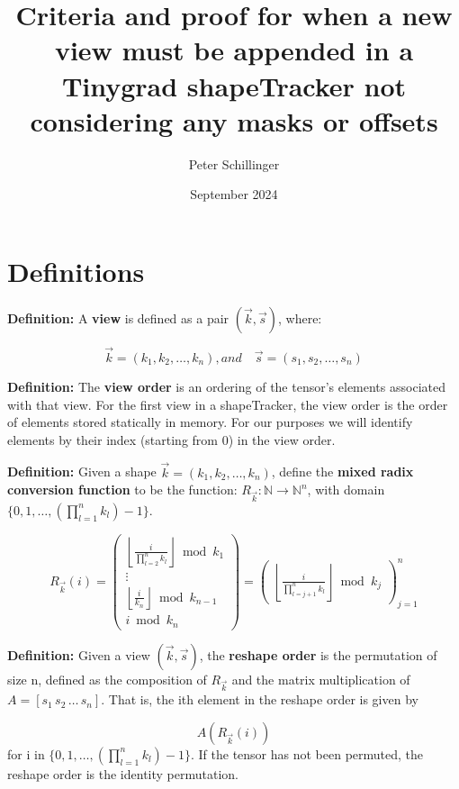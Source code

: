 \documentclass{article}
\title{Criteria and proof for when a new view must be appended in a Tinygrad shapeTracker not considering any masks or offsets}
\author{Peter Schillinger}
\date{September 2024}
\begin{document}
\maketitle
\tableofcontents %

\section{Definitions}

\begin{flushleft}
\textbf{Definition:} A \textbf{view} is defined as a pair \((\vec{k}, \vec{s})\), where:
\end{flushleft}
\[
\vec{k} = (k_1, k_2, \ldots, k_n), and \quad \vec{s} = (s_1, s_2, \ldots, s_n)
\]


\textbf{Definition:} The \textbf{view order} is an ordering of the tensor's elements associated with that view. For the first view in a shapeTracker, the view order is the order of elements stored statically in memory. For our purposes we will identify elements by their index (starting from 0) in the view order. 

\begin{flushleft}
\textbf{Definition:} Given a shape $\vec{k} = (k_1, k_2, \ldots, k_n)$, define the \textbf{mixed radix conversion function} to be the function: $R_{\vec{k}} : \mathbb{N} \rightarrow \mathbb{N}^n$, with domain $\{0, 1, \ldots, (\prod_{l=1}^n k_l) - 1\}$.
\end{flushleft}

\[
R_{\vec{k}}(i) = 
\begin{pmatrix}
\left\lfloor \frac{i}{\prod_{l=2}^{n} k_l} \right\rfloor \bmod k_1 \\
\vdots \\
\left\lfloor \frac{i}{k_n} \right\rfloor \bmod k_{n-1} \\
i \bmod k_n
\end{pmatrix}
= 
\begin{pmatrix}
\left\lfloor \frac{i}{\prod_{l=j+1}^{n} k_l} \right\rfloor \bmod k_j
\end{pmatrix}_{j=1}^n
\]

\begin{flushleft}
\textbf{Definition:} Given a view $(\vec{k}, \vec{s})$, the \textbf{reshape order} is the permutation of size n, defined as the composition of $R_{\vec{k}}$ and the matrix multiplication of $A = [s_1 \, s_2 \, \ldots \, s_n]$. That is, the ith element in the reshape order is given by 

\[
A(R_{\vec{k}}(i))
\]
for i in $\{0, 1, \ldots, (\prod_{l=1}^n k_l) - 1\}$. If the tensor has not been permuted, the reshape order is the identity permutation.
\end{flushleft}
\end{document}
